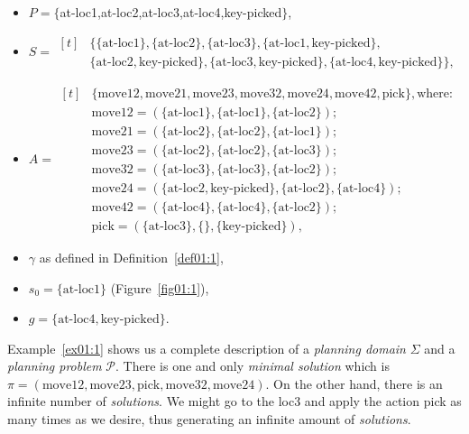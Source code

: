\begin{itemize}
    \item $P=\{${at-loc1,at-loc2,at-loc3,at-loc4,key-picked}$\}$,
    
    \item $S=\begin{aligned}[t]
    &\{\{ \mathrm{at\text{-}loc1}\}, \{ \mathrm{at\text{-}loc2}\}, \{ \mathrm{at\text{-}loc3}\}, \{ \mathrm{at\text{-}loc1,key\text{-}picked}\},\\
    & \{ \mathrm{at\text{-}loc2,key\text{-}picked}\},
    \{ \mathrm{at\text{-}loc3,key\text{-}picked}\}, \{ \mathrm{at\text{-}loc4,key\text{-}picked}\}\},
    \end{aligned}$

    \item $A=\begin{aligned}[t]
    &\mathrm{\{move12,move21,move23,move32,move24,move42,pick\}, where:} \\
    &\mathrm{move12 = (\{at\text{-}loc1\},\{at\text{-}loc1\},\{at\text{-}loc2\});} \\
    &\mathrm{move21 = (\{at\text{-}loc2\},\{at\text{-}loc2\},\{at\text{-}loc1\});} \\
    &\mathrm{move23 = (\{at\text{-}loc2\},\{at\text{-}loc2\},\{at\text{-}loc3\});} \\
    &\mathrm{move32 = (\{at\text{-}loc3\},\{at\text{-}loc3\},\{at\text{-}loc2\});} \\
    &\mathrm{move24 = (\{at\text{-}loc2,key\text{-}picked\},\{at\text{-}loc2\},\{at\text{-}loc4\});} \\
    &\mathrm{move42 = (\{at\text{-}loc4\},\{at\text{-}loc4\},\{at\text{-}loc2\});} \\
    &\mathrm{pick = (\{at\text{-}loc3\},\{\},\{key\text{-}picked\}),}
    \end{aligned}$ 

    \item $\gamma$ as defined in Definition~\ref{def01:1},

    \item $s_0 = \{ \mathrm{at\text{-}loc1}\}$ (Figure~\ref{fig01:1}),

    \item $g = \{ \mathrm{at\text{-}loc4, key\text{-}picked}\}$.
\end{itemize}

\noindent
Example~\ref{ex01:1} shows us a complete description of a \emph{planning domain} $\Sigma$ and a \emph{planning problem} $\mathcal{P}$. There is one and only \emph{minimal solution} which is $\pi=(\mathrm{move12,move23,pick,move32,move24})$. On the other hand, there is an infinite number of \emph{solutions}. We might go to the loc3 and apply the action pick as many times as we desire, thus generating an infinite amount of \emph{solutions}.

